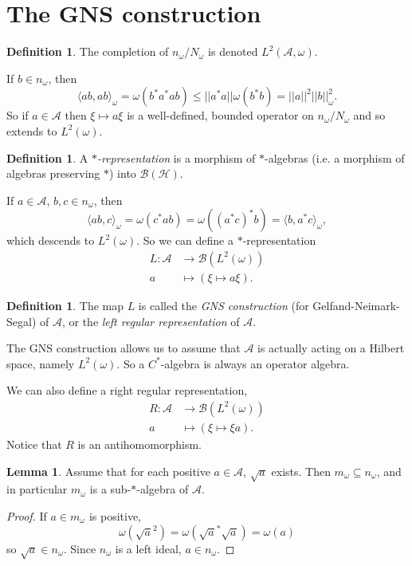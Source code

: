 \documentclass[12pt]{report}
\newcommand{\AAA}{\mathcal A}
\newcommand{\BB}{\mathcal B}
\newcommand{\HH}{\mathcal H}
\theoremstyle{definition}
\newtheorem{lemma}[theorem]{Lemma}
\newtheorem{definition}[theorem]{Definition}
\begin{document}
\section{The GNS construction}
\begin{definition}
    The completion of $n_\omega/N_\omega$ is denoted $L^2(\mathcal A, \omega)$.
\end{definition}
If $b \in n_\omega$, then
$$\langle ab, ab\rangle_\omega
    = \omega(b^*a^*ab)
    \leq ||a^*a|| \omega(b^*b) = ||a||^2 ||b||_\omega^2.$$
So if $a \in \mathcal A$ then $\xi \mapsto a\xi$ is a well-defined, bounded operator on $n_\omega/N_\omega$ and so extends to $L^2(\omega)$.

\begin{definition}
    A \emph{$*$-representation} is a morphism of $*$-algebras (i.e. a morphism of algebras preserving $*$) into $\BB(\HH)$.
\end{definition}
If $a \in \AAA$, $b,c \in n_\omega$, then
$$\langle ab, c\rangle_\omega = \omega(c^*ab) = \omega((a^*c)^*b) = \langle b, a^*c\rangle_\omega,$$
which descends to $L^2(\omega)$. So we can define a $*$-representation
\begin{align*}
    L: \AAA &\to \BB(L^2(\omega))\\
        a &\mapsto (\xi \mapsto a\xi).
\end{align*}
\begin{definition}
    The map $L$ is called the \emph{GNS construction} (for Gelfand-Neimark-Segal) of $\AAA$, or the \emph{left regular representation} of $\AAA$.
\end{definition}
The GNS construction allows us to assume that $\AAA$ is actually acting on a Hilbert space, namely $L^2(\omega)$. So a $C^*$-algebra is always an operator algebra.

We can also define a right regular representation,
\begin{align*}
    R: \AAA &\to \BB(L^2(\omega))\\
        a &\mapsto (\xi \mapsto \xi a).
\end{align*}
Notice that $R$ is an antihomomorphism.

\begin{lemma}
    Assume that for each positive $a \in \AAA$, $\sqrt a$ exists. Then $m_\omega \subseteq n_\omega$, and in particular $m_\omega$ is a sub-$*$-algebra of $\AAA$.
    \end{lemma}
\begin{proof}
If $a \in m_\omega$ is positive,
    $$\omega(\sqrt a^2) = \omega(\sqrt a^* \sqrt a) = \omega(a)$$
so $\sqrt a \in n_\omega$. Since $n_\omega$ is a left ideal, $a \in n_\omega$.
\end{proof}
\end{document}
